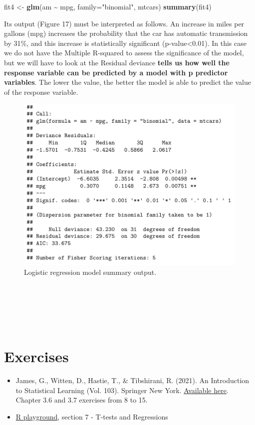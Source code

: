 \documentclass[
]{svmono}
\newenvironment{Shaded}{\begin{snugshade}}{\end{snugshade}}
\newcommand{\AttributeTok}[1]{\textcolor[rgb]{0.13,0.29,0.53}{#1}}
\newcommand{\FunctionTok}[1]{\textcolor[rgb]{0.13,0.29,0.53}{\textbf{#1}}}
\newcommand{\NormalTok}[1]{#1}
\newcommand{\OtherTok}[1]{\textcolor[rgb]{0.56,0.35,0.01}{#1}}
\newcommand{\SpecialCharTok}[1]{\textcolor[rgb]{0.81,0.36,0.00}{\textbf{#1}}}
\newcommand{\StringTok}[1]{\textcolor[rgb]{0.31,0.60,0.02}{#1}}
\begin{document}
\begin{Shaded}
\begin{Highlighting}[]
\NormalTok{fit4 }\OtherTok{\textless{}{-}} \FunctionTok{glm}\NormalTok{(am }\SpecialCharTok{\textasciitilde{}}\NormalTok{ mpg, }\AttributeTok{family=}\StringTok{"binomial"}\NormalTok{, mtcars)}
\FunctionTok{summary}\NormalTok{(fit4)}
\end{Highlighting}
\end{Shaded}

Its output (Figure 17) must be interpreted as follows. An increase in
miles per gallons (mpg) increases the probability that the car has
automatic transmission by 31\%, and this increase is statistically
significant (p-value\textless0.01). In this case we do not have the Multiple
R-squared to assess the significance of the model, but we will have to
look at the Residual deviance \textbf{tells us how well the response variable
can be predicted by a model with p predictor variables}. The lower the
value, the better the model is able to predict the value of the response
variable.

\begin{figure}[H]

{\centering \includegraphics[width=0.5\linewidth,]{images/Schermata 2022-07-07 alle 18.49.38} 

}

\caption{Logistic regression model summary output.}\label{fig:unnamed-chunk-80}
\end{figure}

~

~

~

\hypertarget{exercises-4}{%
\section{Exercises}\label{exercises-4}}

\begin{itemize}
\item
  James, G., Witten, D., Hastie, T., \& Tibshirani, R. (2021). An
  Introduction to Statistical Learning (Vol. 103). Springer New York.
  \href{https://www.statlearning.com}{Available here}. Chapter 3.6 and 3.7
  exercises from 8 to 15.
\item
  \href{https://federicoroscioli.shinyapps.io/exercises/}{R playground},
  section 7 - T-tests and Regressions
\end{itemize}
\end{document}
